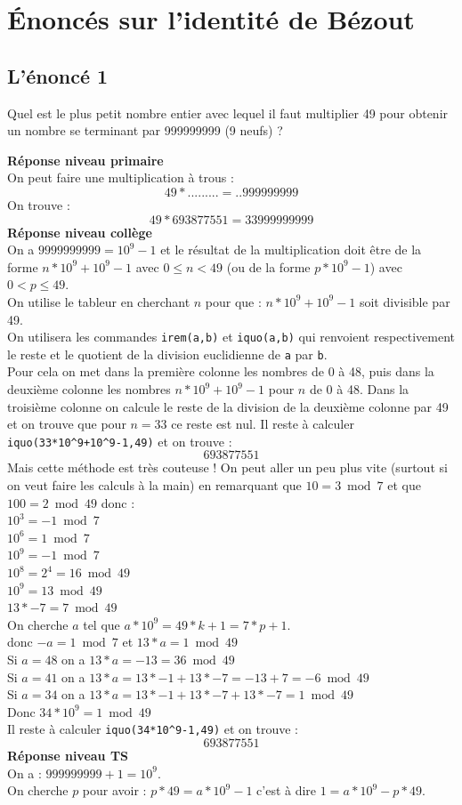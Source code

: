 \documentclass[a4paper,11pt]{book}
\begin{document}
\section{\'Enonc\'es sur l'identit\'e de B\'ezout}
\subsection{L'\'enonc\'e 1}
Quel est le plus petit nombre entier avec lequel il faut multiplier 49 pour 
obtenir un nombre se terminant par 999999999 (9 neufs) ?

{\bf R\'eponse niveau primaire}\\
On peut faire une multiplication \`a trous :
$$49*.........=..999999999$$
On trouve :
$$49*693877551=33999999999$$
{\bf R\'eponse niveau coll\`ege}\\
On a $9999999999=10^9-1$ et le r\'esultat de la multiplication doit \^etre de 
la forme $n*10^9+10^9-1$ avec $0\leq n<49$ (ou de la forme $p*10^9-1$)
avec $0< p \leq 49$.\\
On utilise le tableur en cherchant $n$ pour que :
$n*10^9+10^9-1$ soit divisible par 49.\\
On utilisera les commandes {\tt irem(a,b)} et {\tt iquo(a,b)} qui renvoient 
respectivement le reste et le quotient de la division euclidienne de {\tt a} 
par {\tt b}.\\ 
Pour cela on met dans la premi\`ere colonne les nombres de 0 \`a 48, puis dans 
la deuxi\`eme colonne les nombres $n*10^9+10^9-1$ pour $n$ de 0 \`a 48.
Dans la troisi\`eme colonne on calcule le reste de la division de la deuxi\`eme
colonne par 49 et on trouve que pour $n=33$ ce reste est nul.
Il reste \`a calculer {\tt iquo(33*10\verb|^|9+10\verb|^|9-1,49)} et on 
trouve :
$$693877551$$ 
Mais cette m\'ethode est tr\`es couteuse !
On peut aller un peu plus vite (surtout si on veut faire les calculs \`a la 
main) en remarquant que $10=3 \bmod 7$ et que $100=2 \bmod 49$ donc :\\
$10^3=-1 \bmod 7$\\
$10^6=1 \bmod 7$\\
$10^9=-1 \bmod 7$\\
$10^8=2^4=16 \bmod 49$\\
$10^9=13 \bmod 49$\\
$13*-7=7 \bmod 49$\\
On cherche $a$ tel que $a*10^9=49*k+1=7*p+1$.\\
donc $-a=1 \bmod 7$ et $13*a=1 \bmod 49$\\
Si $a=48$ on a $13*a=-13=36 \bmod 49$\\
Si $a=41$ on a $13*a=13*-1+13*-7=-13+7=-6 \bmod 49$\\
Si $a=34$ on a $13*a=13*-1+13*-7+13*-7=1 \bmod 49$\\
Donc $34*10^9=1 \bmod 49$\\
Il reste \`a calculer {\tt iquo(34*10\verb|^|9-1,49)} et on 
trouve :
$$693877551$$ 
{\bf R\'eponse niveau TS}\\
On a : $999999999+1=10^9$.\\
On cherche $p$ pour avoir : $p*49=a*10^9-1$ c'est \`a dire 
$1=a*10^9-p*49$.
\end{document}
